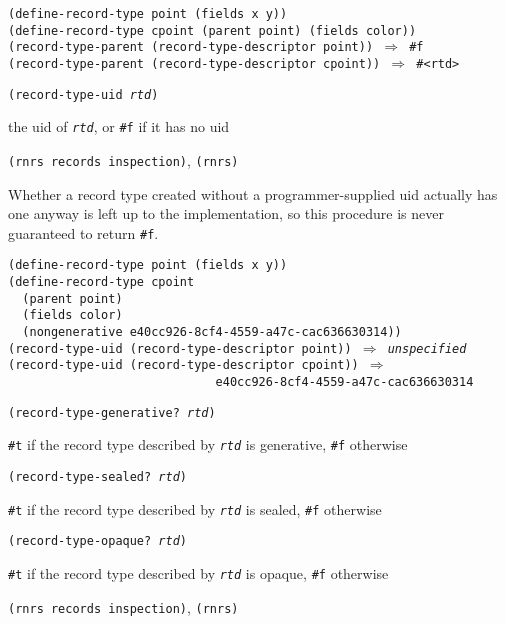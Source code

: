 \begin{alltt}
(define-record-type point (fields x y))
(define-record-type cpoint (parent point) (fields color))
(record-type-parent (record-type-descriptor point)) \(\Rightarrow\) \#{}f
(record-type-parent (record-type-descriptor cpoint)) \(\Rightarrow\) \#{}\textless{}rtd\textgreater{}
\end{alltt}

\begin{description}

\label{records_s36}\item[procedure] \texttt{(record-type-uid \textit{rtd})}



\item[returns] the uid of \texttt{\textit{rtd}}, or \texttt{\#{}f} if it has no uid


\item[libraries] \texttt{(rnrs records inspection)}, \texttt{(rnrs)}
\end{description}


Whether a record type created without a programmer-supplied uid
actually has one anyway is left up to the implementation, so this
procedure is never guaranteed to return \texttt{\#{}f}.


\begin{alltt}
(define-record-type point (fields x y))
(define-record-type cpoint
  (parent point)
  (fields color)
  (nongenerative e40cc926-8cf4-4559-a47c-cac636630314))
(record-type-uid (record-type-descriptor point)) \(\Rightarrow\) \textit{unspecified}
(record-type-uid (record-type-descriptor cpoint)) \(\Rightarrow\)
                             e40cc926-8cf4-4559-a47c-cac636630314
\end{alltt}

\begin{description}

\label{records_s37}\item[procedure] \texttt{(record-type-generative? \textit{rtd})}



\item[returns] \texttt{\#{}t} if the record type described by \texttt{\textit{rtd}} is generative, \texttt{\#{}f} otherwise


\item[procedure] \texttt{(record-type-sealed? \textit{rtd})}



\item[returns] \texttt{\#{}t} if the record type described by \texttt{\textit{rtd}} is sealed, \texttt{\#{}f} otherwise


\item[procedure] \texttt{(record-type-opaque? \textit{rtd})}



\item[returns] \texttt{\#{}t} if the record type described by \texttt{\textit{rtd}} is opaque, \texttt{\#{}f} otherwise


\item[libraries] \texttt{(rnrs records inspection)}, \texttt{(rnrs)}
\end{description}


